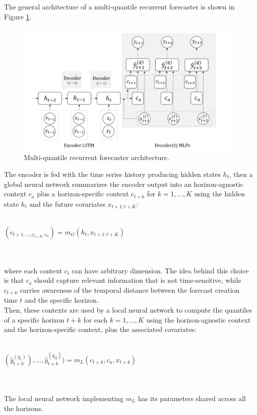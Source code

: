 \documentclass[a4paper, 12pt]{article} %
\begin{document}
	The general architecture of a multi-quantile recurrent forecaster is shown in Figure \ref{fig:mqforecaster}. 
	\begin{figure}
		\includegraphics[width=\linewidth]{img/mqcnn.png}
		\caption{Multi-quantile recurrent forecaster architecture.}
		\label{fig:mqforecaster}
	\end{figure}
	The encoder is fed with the time series history producing hidden states $h_t$,  then a global neural network summarizes the encoder output into an horizon-agnostic context $c_a$ plus a horizon-specific context $c_{t+k}$ for $k=1,...,K$ using the hidden state $h_t$ and the future covariates $x_{t+1:t+K}$:\\\\
	\centerline{
	$
	(c_{t+1, ..., c_{t+K}, c_a}) = m_G(h_t, x_{t+1:t+K})
	$
	}\\\\
	where each context $c_i$ can have arbitrary dimension. The idea behind this choice is that $c_a$ should capture relevant information that is not time-sensitive, while $c_{t+k}$ carries awareness of the temporal distance between the forecast creation time $t$ and the specific horizon.\\ 
	Then, these contexts are used by a local neural network to compute the quantiles of a specific horizon $t+k$ for each $k=1,...,K$ using the horizon-agnostic context and the horizon-specific context, plus the associated covariates:\\\\
	\centerline{
	$
	(\hat{y}_{t+k}^{(q_1)}), ..., \hat{y}_{t+k}^{(q_Q)}) = m_L(c_{t+k}, c_a, x_{t+k})
	$
	}\\\\
	The local neural network implementing $m_L$ has its parameters shared across all the horizons.
	
\end{document}
